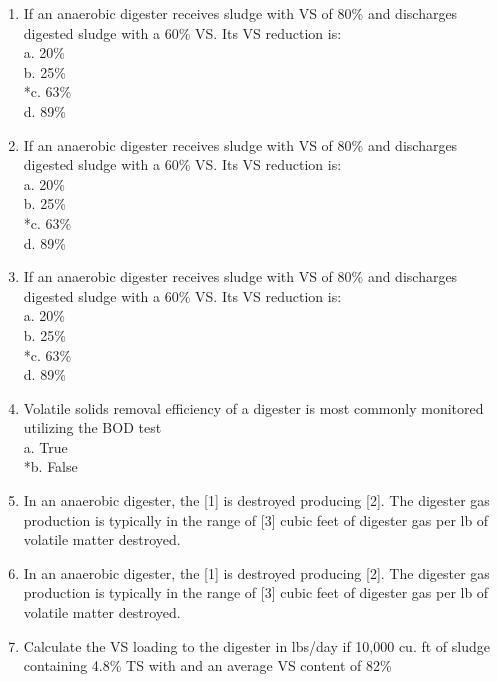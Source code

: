 \documentclass{article}
\begin{document}
\begin{enumerate}
\item  If an anaerobic digester receives sludge with VS of 80\% and discharges digested sludge with a 60\% VS.  Its VS reduction is:\\

a. 20\% \\
b. 25\% \\
*c. 63\% \\
d. 89\% \\

\item  If an anaerobic digester receives sludge with VS of 80\% and discharges digested sludge with a 60\% VS.  Its VS reduction is:\\

a. 20\% \\
b. 25\% \\
*c. 63\% \\
d. 89\% \\

\item  If an anaerobic digester receives sludge with VS of 80\% and discharges digested sludge with a 60\% VS.  Its VS reduction is:\\

a. 20\% \\
b. 25\% \\
*c. 63\% \\
d. 89\% \\

\item  Volatile solids removal efficiency of a digester is most commonly monitored utilizing the BOD test\\

a. True \\
*b. False \\

\item  In an anaerobic digester, the [1] is destroyed producing [2].  The digester gas production is typically in the range of [3] cubic feet of digester gas per lb of volatile matter destroyed. \\

\item  In an anaerobic digester, the [1] is destroyed producing [2].  The digester gas production is typically in the range of [3] cubic feet of digester gas per lb of volatile matter destroyed. \\

\item  Calculate the VS loading to the digester in lbs/day if 10,000 cu. ft of sludge containing 4.8\% TS with and an average VS content of 82\% \\


\end{enumerate}
\end{document}
